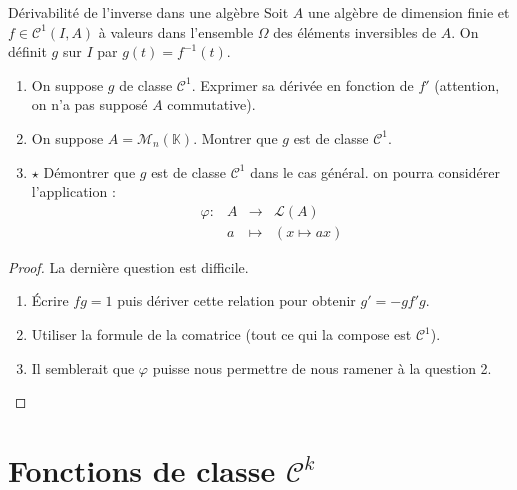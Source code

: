 \documentclass[french,a4paper]{article}
\newcommand{\K}{\mathbb{K}}
\newcommand{\inv}{^{-1}}
\theoremstyle{plain}
\theoremstyle{definition}
\theoremstyle{remark}
\begin{document}
\begin{ex}[Moulin.FV.13]{Dérivabilité de l'inverse dans une algèbre}
	Soit $A$ une algèbre de dimension finie et $f\in\mathcal{C}^1(I,A)$ à valeurs dans l'ensemble $\Omega$ des éléments inversibles de $A$. On définit $g$ sur $I$ par $g(t)=f\inv(t)$.
	\begin{enumerate}
		\item On suppose $g$ de classe $\mathcal{C}^1$. Exprimer sa dérivée en fonction de $f'$ (attention, on n'a pas supposé $A$ commutative).
		\item On suppose $A=\mathcal{M}_n(\K)$. Montrer que $g$ est de classe $\mathcal{C}^1$.
		\item $\star$ Démontrer que $g$ est de classe $\mathcal{C}^1$ dans le cas général. on pourra considérer l'application : $$\begin{array}{lrcl}
			\varphi:&A&\longrightarrow&\mathcal{L}(A) \\
			&a&\longmapsto&(x\mapsto ax)
		\end{array}$$
	\end{enumerate}
\end{ex}
\begin{proof}
	La dernière question est difficile.
	\begin{enumerate}
		\item Écrire $fg=1$ puis dériver cette relation pour obtenir $g'=-gf'g$.
		\item Utiliser la formule de la comatrice (tout ce qui la compose est $\mathcal{C}^1$).
		\item Il semblerait que $\varphi$ puisse nous permettre de nous ramener à la question 2.
	\end{enumerate}
\end{proof}

\section{Fonctions de classe $\mathcal{C}^k$}
\end{document}
